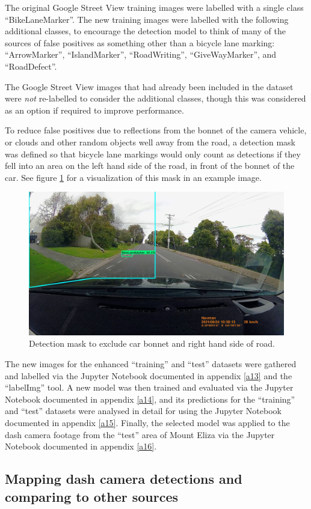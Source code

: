\documentclass[11pt,twoside]{report}
\begin{document}
The original Google Street View training images were labelled with a single class ``BikeLaneMarker''.  The new training images were labelled with the following additional classes, to encourage the detection model to think of many of the sources of false positives as something other than a bicycle lane marking: ``ArrowMarker'', ``IslandMarker'', ``RoadWriting'', ``GiveWayMarker'', and ``RoadDefect''.

The Google Street View images that had already been included in the dataset were \textit{not} re-labelled to consider the additional classes, though this was considered as an option if required to improve performance.

To reduce false positives due to reflections from the bonnet of the camera vehicle, or clouds and other random objects well away from the road, a detection mask was defined so that bicycle lane markings would only count as detections if they fell into an area on the left hand side of the road, in front of the bonnet of the car.  See figure \ref{fig:006} for a visualization of this mask in an example image.

\begin{figure}[h!]
\centering
\includegraphics[width=0.45\linewidth]{f006_mask.jpg}
\caption{Detection mask to exclude car bonnet and right hand side of road.}
\label{fig:006}
\end{figure}

The new images for the enhanced ``training'' and ``test'' datasets were gathered and labelled via the Jupyter Notebook documented in appendix \ref{a13} and the ``labelImg'' tool.  A new model was then trained and evaluated via the Jupyter Notebook documented in appendix \ref{a14}, and its predictions for the ``training'' and ``test'' datasets were analysed in detail for using the Jupyter Notebook documented in appendix \ref{a15}.  Finally, the selected model was applied to the dash camera footage from the ``test'' area of Mount Eliza via the Jupyter Notebook documented in appendix \ref{a16}.


\subsection{Mapping dash camera detections and comparing to other sources}
\label{s:rq3d}
\end{document}
